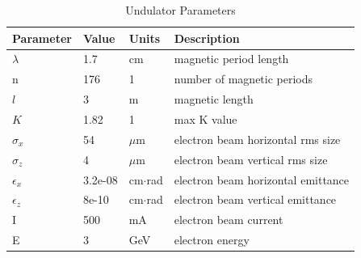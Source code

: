 \documentclass{iucr}
\begin{document}
\begin{table}\label{ivubiomax}
\caption{Undulator Parameters}
\begin{tabular}{@{}llll@{}}
Parameter       & Value         & Units     & Description                           \\
\hline
$\lambda$       & 1.7           & cm              & magnetic period length                \\
n               & 176           & 1               & number of magnetic periods            \\ 
$l$             & 3             & m               & magnetic length                       \\
$K$             & 1.82          & 1               & max K value                           \\
$\sigma_x$      & 54            & $\mu$m          & electron beam horizontal rms size     \\
$\sigma_z$      & 4             & $\mu$m          & electron beam vertical rms size       \\
$\epsilon_x$    & 3.2e-08       & cm$\cdot$rad    & electron beam horizontal emittance    \\
$\epsilon_z$    & 8e-10         & cm$\cdot$rad    & electron beam vertical emittance      \\
I               & 500           & mA              & electron beam current                 \\
E               & 3             & GeV             & electron energy                       \\
\end{tabular}
\end{table}
\end{document}
